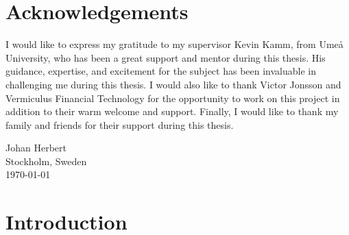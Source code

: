 \documentclass[%
a4paper,							
11pt,								
bibliography=totoc,						
abstracton=true					
]
{scrartcl}
\theoremstyle{plain}
\theoremstyle{definition}
\theoremstyle{remark}
\newcommand{\1}{\mathbbm{1}}
\begin{document}
\section*{Acknowledgements}
I would like to express my gratitude to my supervisor Kevin Kamm, from Umeå University, who has been a great support and mentor during this thesis. His guidance, expertise, and excitement for the subject has been invaluable in challenging me during this thesis. I would also like to thank Victor Jonsson and Vermiculus Financial Technology for the opportunity to work on this project in addition to their warm welcome and support. Finally, I would like to thank my family and friends for their support during this thesis. 

Johan Herbert\\
Stockholm, Sweden\\
\today 

\newpage
\clearpage
\newpage
{\hypersetup{linkcolor=black}
\tableofcontents
}
\newpage
{}
\pagestyle{scrheadings}



\section{Introduction}\label{sec:Introduction}




% 




\end{document}

